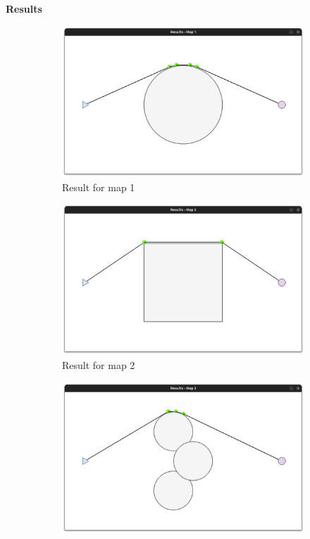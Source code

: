 \documentclass[../main.tex]{subfiles}
\begin{document}
\textbf{Results}
\begin{figure}[H]
	\centering
	\begin{subfigure}[b]{0.24\textwidth}
		\centering
		\includegraphics[width=\textwidth]{IMAGES/part3/rmap1.png}
		\caption*{Result for map 1}
		\label{fig:rmap1}
	\end{subfigure}
	\hfill
	\begin{subfigure}[b]{0.24\textwidth}
		\centering
		\includegraphics[width=\textwidth]{IMAGES/part3/rmap2.png}
		\caption*{Result for map 2}
		\label{fig:rmap2}
	\end{subfigure}
	\hfill
	\begin{subfigure}[b]{0.24\textwidth}
		\centering
		\includegraphics[width=\textwidth]{IMAGES/part3/rmap3.png}

\end{subfigure}
\end{figure}
\end{document}
